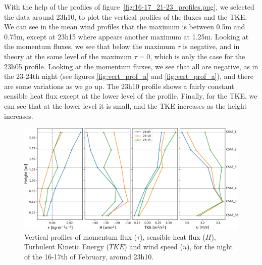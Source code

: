 With the help of the profiles of figure~\ref{fig:16-17_21-23_profiles.png}, we selected the data around 23h10, to plot the vertical profiles of the fluxes and the TKE. We can see in the mean wind profiles that the maximum is between 0.5m and 0.75m, except at 23h15 where appears another maximum at 1.25m. Looking at the momentum fluxes, we see that below the maximum $\tau$ is negative, and in theory at the same level of the maximum $\tau = 0$, which is only the case for the 23h05 profile. Looking at the momentum fluxes, we see that all are negative, as in the 23-24th night (see figures \ref{fig:vert_prof_a} and \ref{fig:vert_prof_a}), and there are some variations as we go up. The 23h10 profile shows a fairly constant sensible heat flux except at the lower level of the profile. Finally, for the TKE, we can see that at the lower level it is small, and the TKE increases as the height increases.

\begin{figure}
    \centering
    \includegraphics[width=1\textwidth]{fig/chapter_4/16-17/vert_prof_d_speedmax.png}
    \caption{Vertical profiles of momentum flux ($\tau$), sensible heat flux ($H$), Turbulent Kinetic Energy ($TKE$) and wind speed ($u$), for the night of the 16-17th of February, around 23h10.}
    \label{fig:vert_prof_d}
\end{figure}